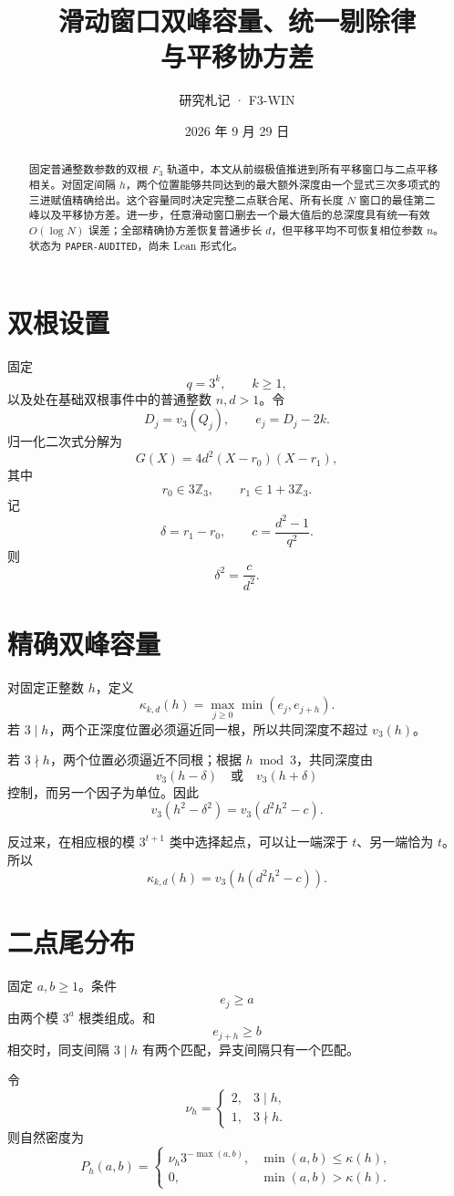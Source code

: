 \documentclass[11pt,a4paper]{ctexart}
\title{\bfseries 滑动窗口双峰容量、统一剔除律\\与平移协方差}
\author{研究札记 · F3-WIN}
\date{2026 年 9 月 29 日}
\begin{document}
\maketitle
\begin{abstract}
固定普通整数参数的双根 \(F_3\) 轨道中，本文从前缀极值推进到所有平移窗口与二点平移相关。对固定间隔 \(h\)，两个位置能够共同达到的最大额外深度由一个显式三次多项式的三进赋值精确给出。这个容量同时决定完整二点联合尾、所有长度 \(N\) 窗口的最佳第二峰以及平移协方差。进一步，任意滑动窗口删去一个最大值后的总深度具有统一有效 \(O(\log N)\) 误差；全部精确协方差恢复普通步长 \(d\)，但平移平均不可恢复相位参数 \(n\)。状态为 \texttt{PAPER-AUDITED}，尚未 Lean 形式化。
\end{abstract}

\section{双根设置}
固定
\[
q=3^k,\qquad k\ge1,
\]
以及处在基础双根事件中的普通整数 \(n,d>1\)。令
\[
D_j=v_3(Q_j),\qquad e_j=D_j-2k.
\]
归一化二次式分解为
\[
G(X)=4d^2(X-r_0)(X-r_1),
\]
其中
\[
r_0\in3\mathbb Z_3,\qquad
r_1\in1+3\mathbb Z_3.
\]
记
\[
\delta=r_1-r_0,\qquad
c=\frac{d^2-1}{q^2}.
\]
则
\[
\delta^2=\frac{c}{d^2}.
\]

\section{精确双峰容量}
对固定正整数 \(h\)，定义
\[
\kappa_{k,d}(h)=
\max_{j\ge0}\min(e_j,e_{j+h}).
\]
若 \(3\mid h\)，两个正深度位置必须逼近同一根，所以共同深度不超过 \(v_3(h)\)。

若 \(3\nmid h\)，两个位置必须逼近不同根；根据 \(h\bmod3\)，共同深度由
\[
v_3(h-\delta)
\quad\text{或}\quad
v_3(h+\delta)
\]
控制，而另一个因子为单位。因此
\[
v_3(h^2-\delta^2)
=
v_3(d^2h^2-c).
\]

反过来，在相应根的模 \(3^{t+1}\) 类中选择起点，可以让一端深于 \(t\)、另一端恰为 \(t\)。所以
\[
\boxed{
\kappa_{k,d}(h)
=
v_3\!\left(h(d^2h^2-c)\right).
}
\]

\section{二点尾分布}
固定 \(a,b\ge1\)。条件
\[
e_j\ge a
\]
由两个模 \(3^a\) 根类组成。和
\[
e_{j+h}\ge b
\]
相交时，同支间隔 \(3\mid h\) 有两个匹配，异支间隔只有一个匹配。

令
\[
\nu_h=
\begin{cases}
2,&3\mid h,\\
1,&3\nmid h.
\end{cases}
\]
则自然密度为
\[
\boxed{
P_h(a,b)
=
\begin{cases}
\nu_h3^{-\max(a,b)},&
\min(a,b)\le\kappa(h),\\
0,&\min(a,b)>\kappa(h).
\end{cases}
}
\]
\end{document}
